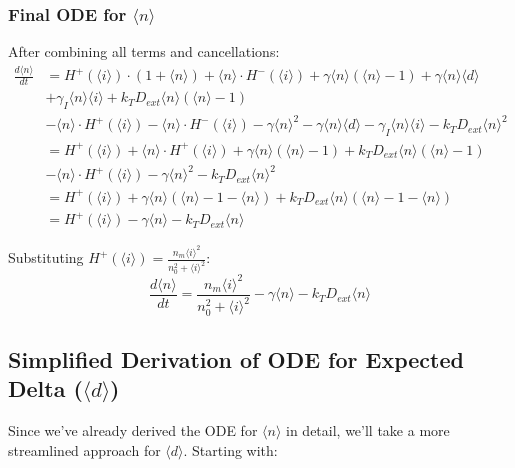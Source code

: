 \documentclass{article}
\begin{document}
\begin{flushleft}
\subsubsection*{Final ODE for $\langle n \rangle$}

After combining all terms and cancellations:
\begin{align*}
\frac{d\langle n \rangle}{dt} &= H^+(\langle i \rangle) \cdot (1 + \langle n \rangle) + \langle n \rangle \cdot H^-(\langle i \rangle) + \gamma \langle n \rangle (\langle n \rangle - 1) + \gamma \langle n \rangle \langle d \rangle \\
&+ \gamma_I \langle n \rangle \langle i \rangle + k_T D_{ext} \langle n \rangle (\langle n \rangle - 1) \\
&- \langle n \rangle \cdot H^+(\langle i \rangle) - \langle n \rangle \cdot H^-(\langle i \rangle) - \gamma \langle n \rangle^2 - \gamma \langle n \rangle \langle d \rangle - \gamma_I \langle n \rangle \langle i \rangle - k_T D_{ext} \langle n \rangle^2 \\
&= H^+(\langle i \rangle) + \langle n \rangle \cdot H^+(\langle i \rangle) + \gamma \langle n \rangle (\langle n \rangle - 1) + k_T D_{ext} \langle n \rangle (\langle n \rangle - 1) \\
&- \langle n \rangle \cdot H^+(\langle i \rangle) - \gamma \langle n \rangle^2 - k_T D_{ext} \langle n \rangle^2 \\
&= H^+(\langle i \rangle) + \gamma \langle n \rangle (\langle n \rangle - 1 - \langle n \rangle) + k_T D_{ext} \langle n \rangle (\langle n \rangle - 1 - \langle n \rangle) \\
&= H^+(\langle i \rangle) - \gamma \langle n \rangle - k_T D_{ext} \langle n \rangle
\end{align*}

Substituting $H^+(\langle i \rangle)=\frac{n_m \langle i \rangle^2}{n_0^2 + \langle i \rangle^2}$:
$$\frac{d\langle n \rangle}{dt} = \frac{n_m \langle i \rangle^2}{n_0^2 + \langle i \rangle^2} - \gamma \langle n \rangle - k_T D_{ext} \langle n \rangle$$

\subsection*{Simplified Derivation of ODE for Expected Delta ($\langle d \rangle$)}

Since we've already derived the ODE for $\langle n \rangle$ in detail, we'll take a more streamlined approach for $\langle d \rangle$. Starting with:


\end{flushleft}
\end{document}
